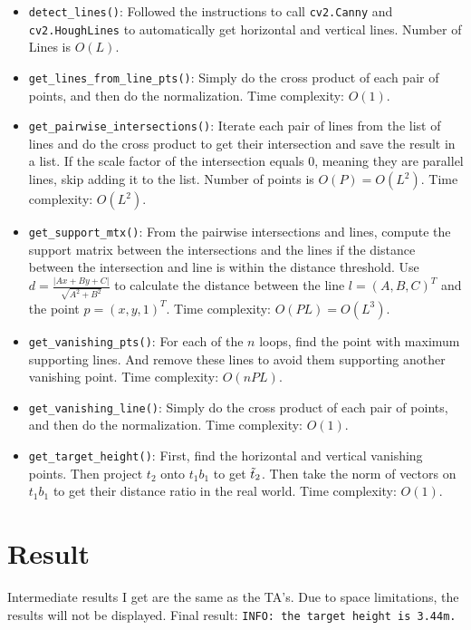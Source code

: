 \begin{itemize}
    \item \texttt{detect\_lines()}: Followed the instructions to call \texttt{cv2.Canny} and \texttt{cv2.HoughLines} to automatically get horizontal and vertical lines. Number of Lines is $O(L)$.
    
    \item \texttt{get\_lines\_from\_line\_pts()}: Simply do the cross product of each pair of points, and then do the normalization. Time complexity: $O(1)$.
    
    \item \texttt{get\_pairwise\_intersections()}: Iterate each pair of lines from the list of lines and do the cross product to get their intersection and save the result in a list. If the scale factor of the intersection equals $0$, meaning they are parallel lines, skip adding it to the list. Number of points is $O(P)=O(L^2)$. Time complexity: $O(L^2)$.
    
    \item \texttt{get\_support\_mtx()}: From the pairwise intersections and lines, compute the support matrix between the intersections and the lines if the distance between the intersection and line is within the distance threshold. Use $d = \frac{|Ax + By + C|}{\sqrt{A^{2} + B^{2}}}$ to calculate the distance between the line $l=(A,B,C)^T$ and the point $p=(x,y,1)^T$. Time complexity: $O(PL)=O(L^3)$.
    
    \item \texttt{get\_vanishing\_pts()}: For each of the $n$ loops, find the point with maximum supporting lines. And remove these lines to avoid them supporting another vanishing point. Time complexity: $O(nPL)$.
    
    \item \texttt{get\_vanishing\_line()}: Simply do the cross product of each pair of points, and then do the normalization. Time complexity: $O(1)$.
    
    \item \texttt{get\_target\_height()}: First, find the horizontal and vertical vanishing points. Then project $t_2$ onto $t_{1}b_{1}$ to get $\Tilde{t}_2$. Then take the norm of vectors on $t_{1}b_{1}$ to get their distance ratio in the real world. Time complexity: $O(1)$.

\end{itemize}

\section{Result}

Intermediate results I get are the same as the TA's. Due to space limitations, the results will not be displayed. Final result: \texttt{INFO: the target height is 3.44m.}




